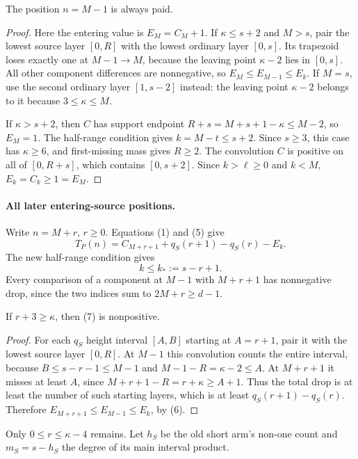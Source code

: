 \begin{lemma}
The position $n=M-1$ is always paid.
\end{lemma}
\begin{proof}
Here the entering value is $E_M=C_M+1$.
If $\kappa\le s+2$ and $M>s$, pair the lowest source layer $[0,R]$
with the lowest ordinary layer $[0,s]$. Its trapezoid loses exactly
one at $M-1\to M$, because the leaving point $\kappa-2$ lies in
$[0,s]$. All other component differences are nonnegative, so
$E_M\le E_{M-1}\le E_k$.
If $M=s$, use the second ordinary layer $[1,s-2]$ instead: the leaving
point $\kappa-2$ belongs to it because $3\le\kappa\le M$.

If $\kappa>s+2$, then $C$ has support endpoint
$R+s=M+s+1-\kappa\le M-2$, so $E_M=1$.
The half-range condition gives $k=M-t\le s+2$.
Since $s\ge3$, this case has $\kappa\ge6$, and first-missing mass
gives $R\ge2$. The convolution $C$ is positive on all of $[0,R+s]$,
which contains $[0,s+2]$. Since $k>\ell\ge0$ and $k<M$,
$E_k=C_k\ge1=E_M$.
\end{proof}

\paragraph{All later entering-source positions.}
Write $n=M+r$, $r\ge0$. Equations (1) and (5) give
\[
 T_P(n)=C_{M+r+1}+q_S(r+1)-q_S(r)-E_k.                 \tag{7}
\]
The new half-range condition gives
\[
                      k\le k_*:=s-r+1.                 \tag{8}
\]
Every comparison of a component at $M-1$ with $M+r+1$ has nonnegative
drop, since the two indices sum to $2M+r\ge d-1$.

\begin{lemma}
If $r+3\ge\kappa$, then (7) is nonpositive.
\end{lemma}
\begin{proof}
For each $q_S$ height interval $[A,B]$ starting at $A=r+1$, pair it
with the lowest source layer $[0,R]$. At $M-1$ this convolution counts
the entire interval, because $B\le s-r-1\le M-1$ and
$M-1-R=\kappa-2\le A$. At $M+r+1$ it misses at least $A$, since
$M+r+1-R=r+\kappa\ge A+1$.
Thus the total drop is at least the number of such starting layers,
which is at least $q_S(r+1)-q_S(r)$. Therefore
$E_{M+r+1}\le E_{M-1}\le E_k$, by (6).
\end{proof}

Only $0\le r\le\kappa-4$ remains. Let $h_S$ be the old short arm's
non-one count and $m_S=s-h_S$ the degree of its main interval product.

